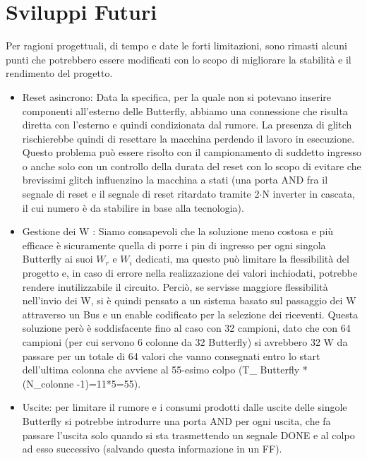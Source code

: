 \section{Sviluppi Futuri}
Per ragioni progettuali, di tempo e date le forti limitazioni, sono rimasti alcuni punti che potrebbero essere modificati con lo scopo di migliorare la stabilità e il rendimento del progetto.

\begin{itemize}
\item   Reset asincrono: Data la specifica, per la quale non si potevano inserire componenti all’esterno delle Butterfly,  abbiamo una connessione che risulta diretta con l’esterno e quindi condizionata dal rumore. La presenza di glitch rischierebbe quindi di resettare la macchina perdendo il lavoro in esecuzione. Questo problema può essere risolto con il campionamento di suddetto ingresso o anche solo con un controllo della durata del reset con lo scopo di evitare che brevissimi glitch influenzino la macchina a stati (una porta AND fra il segnale di reset e il segnale di reset ritardato tramite 2$\cdot$N inverter in cascata, il cui numero è da stabilire in base alla tecnologia).
\item   Gestione dei W : Siamo consapevoli che la soluzione meno costosa e più efficace è sicuramente quella di porre i pin di ingresso per ogni singola Butterfly ai suoi $W_r$ e $W_i$ dedicati, ma questo può limitare la flessibilità del progetto e, in caso di errore nella realizzazione dei valori inchiodati, potrebbe rendere inutilizzabile il circuito. Perciò, se servisse maggiore flessibilità nell'invio dei W, si è quindi pensato a un sistema basato sul passaggio dei W attraverso un Bus e un enable codificato per la selezione dei riceventi. Questa soluzione però è soddisfacente fino al caso con 32 campioni, dato che con 64 campioni (per cui servono 6 colonne da 32 Butterfly) si avrebbero 32 W da passare per un totale di 64 valori che vanno consegnati entro lo start dell’ultima colonna che avviene al 55-esimo colpo (T\_ Butterfly * (N\_colonne -1)=11*5=55).
\item Uscite: per limitare il rumore e i consumi prodotti dalle uscite delle singole Butterfly si potrebbe introdurre una porta AND per ogni uscita, che fa passare l’uscita solo quando si sta trasmettendo un segnale DONE e al colpo ad esso successivo (salvando questa informazione in un FF).
\end{itemize}
